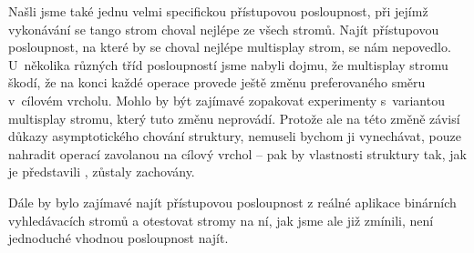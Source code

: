 Našli jsme také jednu velmi specifickou přístupovou posloupnost, při jejímž vykonávání se tango strom choval nejlépe ze všech stromů. Najít přístupovou posloupnost, na které by se choval nejlépe multisplay strom, se nám nepovedlo. U~několika různých tříd posloupností jsme nabyli dojmu, že multisplay stromu škodí, že na konci každé operace  provede ještě změnu preferovaného směru v~cílovém vrcholu. Mohlo by být zajímavé zopakovat experimenty s~variantou multisplay stromu, který tuto změnu neprovádí. Protože ale na této změně závisí důkazy asymptotického chování struktury, nemuseli bychom ji vynechávat, pouze nahradit operací  zavolanou na cílový vrchol -- pak by vlastnosti struktury tak, jak je  představili \citet{multisplay}, zůstaly zachovány.

Dále by bylo zajímavé najít přístupovou posloupnost z reálné aplikace binárních vyhledávacích stromů a otestovat stromy na ní, jak jsme ale již zmínili, není jednoduché vhodnou posloupnost najít.

